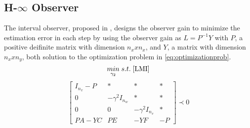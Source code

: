 \subsection{H-$\infty$ Observer}
The interval observer, proposed in \cite{Tang2019}, designs the observer gain to minimize the estimation error in each step by using the observer gain as $L= P^{-1}Y$ with $P$, a positive deifinite matrix with dimension $n_x x n_x$, and $Y$, a matrix with dimension $n_x x n_y$, both solution to the optimization problem in \eqref{eq:optimizationprob}.
\begin{equation}
\label{eq:optimizationprob}
\underset{\gamma _2}{min} \;
s.t. \; \eqref{LMI}
\end{equation} 
\begin{equation}
\label{LMI}
\left[\begin{matrix}
I_{n_x} -P & * & * & *\\
0 & -\gamma ^2 I_{n_w} & * &* \\
0 & 0 & -\gamma ^2 I_{n_v} & *\\
PA-YC & PE & -YF & -P
\end{matrix}\right]  \prec 0
\end{equation} 
